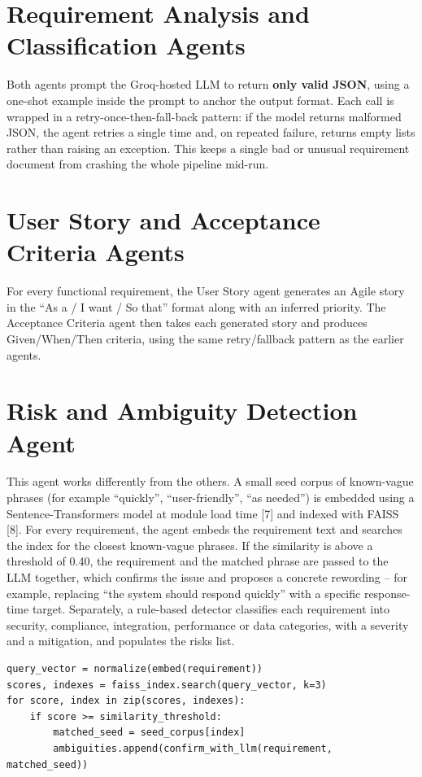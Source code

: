 \documentclass[12pt,a4paper,openany]{report}
\begin{document}
\section{Requirement Analysis and Classification Agents}
Both agents prompt the Groq-hosted LLM to return \textbf{only valid JSON},
using a one-shot example inside the prompt to anchor the output format.
Each call is wrapped in a retry-once-then-fall-back pattern: if the model
returns malformed JSON, the agent retries a single time and, on repeated
failure, returns empty lists rather than raising an exception. This keeps
a single bad or unusual requirement document from crashing the whole
pipeline mid-run.

\section{User Story and Acceptance Criteria Agents}
For every functional requirement, the User Story agent generates an Agile
story in the ``As a / I want / So that'' format along with an inferred
priority. The Acceptance Criteria agent then takes each generated story
and produces Given/When/Then criteria, using the same retry/fallback
pattern as the earlier agents.

\section{Risk and Ambiguity Detection Agent}
This agent works differently from the others. A small seed corpus of
known-vague phrases (for example ``quickly'', ``user-friendly'', ``as
needed'') is embedded using a Sentence-Transformers model at module load
time [7] and indexed with FAISS [8]. For every requirement, the agent
embeds the requirement text and searches the index for the closest
known-vague phrases. If the similarity is above a threshold of 0.40, the
requirement and the matched phrase are passed to the LLM together, which
confirms the issue and proposes a concrete rewording -- for example,
replacing ``the system should respond quickly'' with a specific
response-time target. Separately, a rule-based detector classifies each
requirement into security, compliance, integration, performance or data
categories, with a severity and a mitigation, and populates the risks list.

\begin{lstlisting}
query_vector = normalize(embed(requirement))
scores, indexes = faiss_index.search(query_vector, k=3)
for score, index in zip(scores, indexes):
    if score >= similarity_threshold:
        matched_seed = seed_corpus[index]
        ambiguities.append(confirm_with_llm(requirement, matched_seed))
\end{lstlisting}
\end{document}
